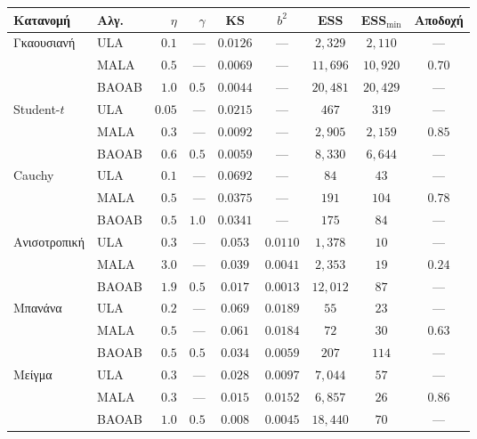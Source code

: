 \begin{table}[H]
\centering
\footnotesize
\begin{tabular}{llrrccccc}
\toprule
Κατανομή & Αλγ. & $\eta$ & $\gamma$ & KS & $b^2$ & ESS & ESS$_{\min}$ & Αποδοχή \\
\midrule
Γκαουσιανή   & ULA   & $0.1$  & ---   & $0.0126$ & --- & $2{,}329$ & $2{,}110$ & --- \\
             & MALA  & $0.5$  & ---   & $0.0069$ & --- & $11{,}696$ & $10{,}920$ & $0.70$ \\
             & BAOAB & $1.0$  & $0.5$ & $\mathbf{0.0044}$ & --- & $20{,}481$ & $20{,}429$ & --- \\
\midrule
Student-$t$  & ULA   & $0.05$ & ---   & $0.0215$ & --- & $467$ & $319$ & --- \\
             & MALA  & $0.3$  & ---   & $0.0092$ & --- & $2{,}905$ & $2{,}159$ & $0.85$ \\
             & BAOAB & $0.6$  & $0.5$ & $\mathbf{0.0059}$ & --- & $8{,}330$ & $6{,}644$ & --- \\
\midrule
Cauchy       & ULA   & $0.1$  & ---   & $0.0692$ & --- & $84$ & $43$ & --- \\
             & MALA  & $0.5$  & ---   & $0.0375$ & --- & $191$ & $104$ & $0.78$ \\
             & BAOAB & $0.5$  & $1.0$ & $\mathbf{0.0341}$ & --- & $175$ & $84$ & --- \\
\midrule
Ανισοτροπική & ULA   & $0.3$  & ---   & $0.053$ & $0.0110$ & $1{,}378$ & $10$ & --- \\
             & MALA  & $3.0$  & ---   & $0.039$ & $0.0041$ & $2{,}353$ & $19$ & $0.24$ \\
             & BAOAB & $1.9$  & $0.5$ & $0.017$ & $\mathbf{0.0013}$ & $12{,}012$ & $87$ & --- \\
\midrule
Μπανάνα      & ULA   & $0.2$  & ---   & $0.069$ & $0.0189$ & $55$ & $23$ & --- \\
             & MALA  & $0.5$  & ---   & $0.061$ & $0.0184$ & $72$ & $30$ & $0.63$ \\
             & BAOAB & $0.5$  & $0.5$ & $0.034$ & $\mathbf{0.0059}$ & $207$ & $114$ & --- \\
\midrule
Μείγμα       & ULA   & $0.3$  & ---   & $0.028$ & $0.0097$ & $7{,}044$ & $57$ & --- \\
             & MALA  & $0.3$  & ---   & $0.015$ & $0.0152$ & $6{,}857$ & $26$ & $0.86$ \\
             & BAOAB & $1.0$  & $0.5$ & $0.008$ & $\mathbf{0.0045}$ & $18{,}440$ & $70$ & --- \\

\end{tabular}
\end{table}
